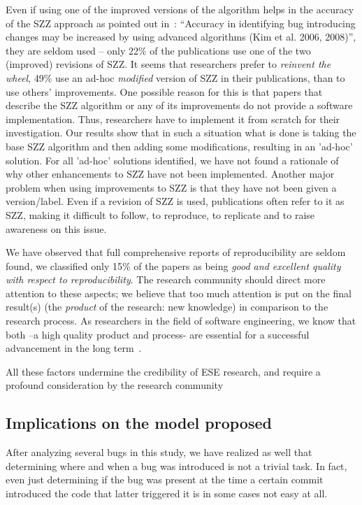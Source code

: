 \documentclass[a4paper, 12pt]{book}
\begin{document}
Even if using one of the improved versions of the algorithm helps in the accuracy of the SZZ approach as pointed out in~\cite{rahman2012clones}: ``Accuracy in identifying bug introducing changes may be increased by using advanced algorithms (Kim et al. 2006, 2008)'', they are seldom used -- only 22\% of the publications use one of the two (improved) revisions of SZZ. It seems that researchers prefer to \emph{reinvent the wheel}, 49\% use an ad-hoc \emph{modified} version of SZZ in their publications, than to use others' improvements. One possible reason for this is that papers that describe the SZZ algorithm or any of its improvements do not provide a software implementation. Thus, researchers have to implement it from scratch for their investigation. Our results show that in such a situation what is done is taking the base SZZ algorithm and then adding some modifications, resulting in an 'ad-hoc' solution. For all 'ad-hoc' solutions identified, we have not found a rationale of why other enhancements to SZZ have not been implemented. Another major problem when using improvements to SZZ is that they have not been given a version/label. Even if a revision of SZZ is used, publications often refer to it as SZZ, making it difficult to follow, to reproduce, to replicate and to raise awareness on this issue.

We have observed that full comprehensive reports of reproducibility are seldom found, we classified only 15\% of the papers as being \emph{good and excellent quality with respect to reproducibility}. The research community should direct more attention to these aspects; we believe that too much attention is put on the final result(s) (the \emph{product} of the research: new knowledge) in comparison to the research process. As researchers in the field of software engineering, we know that both --a high quality product and process- are essential for a successful advancement in the long term~\cite{kan2002metrics}.

All these factors undermine the credibility of ESE research, and require a profound consideration  by the research community

\subsection{Implications on the model proposed}
\label{subsec:implications}
After analyzing several bugs in this study, we have realized as well that determining where and when a bug was introduced is not a trivial task. In fact, even just determining if the bug was present at the time a certain commit introduced the code that latter triggered it is in some cases not easy at all.
\end{document}
